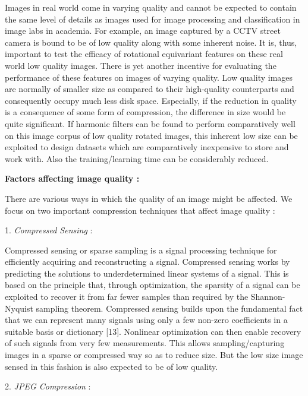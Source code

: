 \documentclass{article}
\begin{document}
Images in real world come in varying quality and cannot be expected to contain the same level of details as images used for image processing and classification in image labs in academia. For example, an image captured by a CCTV street camera is bound to be of low quality along with some inherent noise. It is, thus, important to test the efficacy of rotational equivariant features on these real world low quality images. There is yet another incentive for evaluating the performance of these features on images of varying quality. Low quality images are normally of smaller size as compared to their high-quality counterparts and consequently occupy much less disk space. Especially, if the reduction in quality is a consequence of some form of compression, the difference in size would be quite significant. If harmonic filters can be found to perform comparatively well on this image corpus of low quality rotated images, this inherent low size can be exploited to design datasets which are comparatively inexpensive to store and work with. Also the training/learning time can be considerably reduced.

\textbf{Factors affecting image quality :}

There are various ways in which the quality of an image might be affected. We focus on two important compression techniques that affect image quality :

1.	\emph{Compressed Sensing} : 

Compressed sensing or sparse sampling is a signal processing technique for efficiently acquiring and reconstructing a signal. Compressed sensing works by predicting the solutions to underdetermined linear systems of a signal. This is based on the principle that, through optimization, the sparsity of a signal can be exploited to recover it from far fewer samples than required by the Shannon-Nyquist sampling theorem. Compressed sensing builds upon the fundamental fact that we can represent many signals using only a few non-zero coefficients in a suitable basis or dictionary [13]. Nonlinear optimization can then enable recovery of such signals from very few measurements. This allows sampling/capturing images in a sparse or compressed way so as to reduce size. But the low size image sensed in this fashion is also expected to be of low quality.

2.	\emph{ JPEG Compression }:
\end{document}
